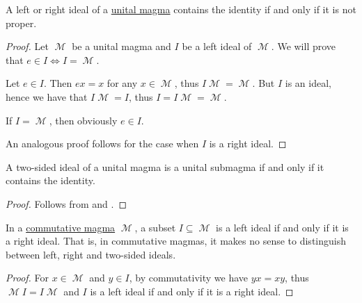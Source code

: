 \begin{proposition}\label{thm:proper_ideals_containing_identity}
  A left or right ideal of a \hyperref[def:unital_magma]{unital magma} contains the identity if and only if it is not proper.
\end{proposition}
\begin{proof}
  Let \( \mscrM \) be a unital magma and \( I \) be a left ideal of \( \mscrM \). We will prove that \( e \in I \iff I = \mscrM \).

  \SufficiencySubProof Let \( e \in I \). Then \( ex = x \) for any \( x \in \mscrM \), thus \( I\mscrM = \mscrM \). But \( I \) is an ideal, hence we have that \( I\mscrM = I \), thus \( I = I\mscrM = \mscrM \).

  \NecessitySubProof If \( I = \mscrM \), then obviously \( e \in I \).

  An analogous proof follows for the case when \( I \) is a right ideal.
\end{proof}

\begin{corollary}\label{thm:unital_magma_ideal_is_submagma_iff_contains_identity}
  A two-sided ideal of a unital magma is a unital submagma if and only if it contains the identity.
\end{corollary}
\begin{proof}
  Follows from  and .
\end{proof}

\begin{proposition}\label{thm:commutative_magma_ideals}
  In a \hyperref[def:magma/commutative]{commutative magma} \( \mscrM \), a subset \( I \subseteq \mscrM \) is a left ideal if and only if it is a right ideal. That is, in commutative magmas, it makes no sense to distinguish between left, right and two-sided ideals.
\end{proposition}
\begin{proof}
  For \( x \in \mscrM \) and \( y \in I \), by commutativity we have \( yx = xy \), thus \( \mscrM I = I \mscrM \) and \( I \) is a left ideal if and only if it is a right ideal.
\end{proof}

